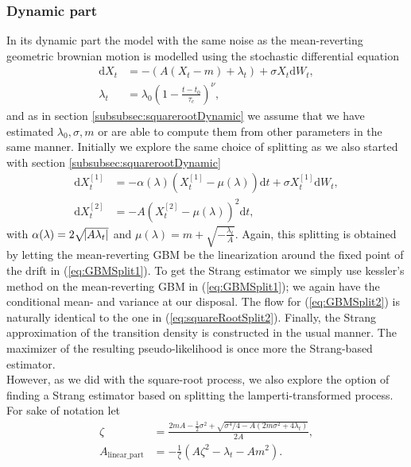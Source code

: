 \subsubsection{Dynamic part}\label{subsubsec:meanrevertingGBMDynamic}
In its dynamic part the model with the same noise as the mean-reverting geometric brownian motion is modelled using the stochastic differential equation
\begin{align}
    \mathrm{d}X_t &= -\left(A\left(X_t - m\right) + \lambda_t\right) + \sigma X_t \mathrm{d}W_t, \\
    \lambda_t &= \lambda_0\left(1 - \frac{t - t_0}{\tau_c}\right)^\nu,
\end{align}
and as in section \ref{subsubsec:squarerootDynamic} we assume that we have estimated $\lambda_0, \sigma, m$ or are able to compute them from other parameters in the same manner. Initially we explore the same choice of splitting as we also started with section \ref{subsubsec:squarerootDynamic}
\begin{align}
    \mathrm{d}X_t^{[1]} &= -\alpha(\lambda)\left(X_t^{[1]} - \mu(\lambda)\right)  \mathrm{d}t + \sigma X_t^{[1]} \mathrm{d}W_t, \label{eq:GBMSplit1} \\
    \mathrm{d}X_t^{[2]} &= - A \left(X_t^{[2]} - \mu(\lambda)\right)^2 \mathrm{d}t, \label{eq:GBMSplit2}
\end{align}
with $\alpha(\lambda) = 2\sqrt{\abs{A\lambda_t}}$ and $\mu(\lambda) = m + \sqrt{-\frac{\lambda_t}{A}}$.
Again, this splitting is obtained by letting the mean-reverting GBM be the linearization around the fixed point of the drift in (\ref{eq:GBMSplit1}). To get the Strang estimator we simply use kessler's method on the mean-reverting GBM in (\ref{eq:GBMSplit1}); we again have the conditional mean- and variance at our disposal. The flow for (\ref{eq:GBMSplit2}) is naturally identical to the one in (\ref{eq:squareRootSplit2}). Finally, the Strang approximation of the transition density is constructed in the usual manner. The maximizer of the resulting pseudo-likelihood is once more the Strang-based estimator.\\
However, as we did with the square-root process, we also explore the option of finding a Strang estimator based on splitting the lamperti-transformed process. For sake of notation let
\begin{align}
    \zeta &= \frac{2mA - \frac{1}{2}\sigma^2 + \sqrt{\sigma^4/4 - A\left(2m\sigma^2 + 4\lambda_t\right)}}{2A},\\
    A_{\mathrm{linear\_part}} &= - \frac{1}{\zeta}\left(A \zeta^2 - \lambda_t - Am^2\right).
\end{align}
